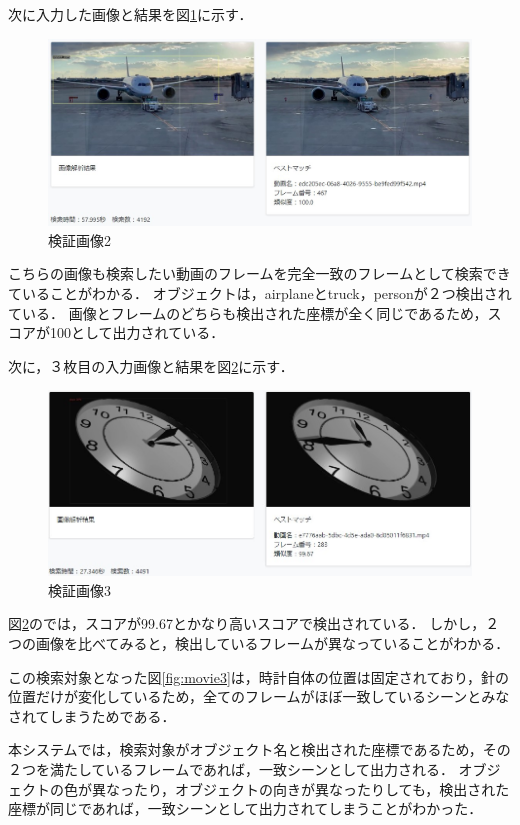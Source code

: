 \documentclass[a4j,12pt,dvipdfmx]{jreport}
\begin{document}
次に入力した画像と結果を図\ref{fig:img_1-2}に示す．
\begin{figure}[b]
  \centering
  \includegraphics[width=13cm]{image/result_1_2.jpg}
  \caption{検証画像2}
  \label{fig:img_1-2}
\end{figure}

こちらの画像も検索したい動画のフレームを完全一致のフレームとして検索できていることがわかる．
オブジェクトは，airplaneとtruck，personが２つ検出されている．
画像とフレームのどちらも検出された座標が全く同じであるため，スコアが100として出力されている．


次に，３枚目の入力画像と結果を図\ref{fig:img_1-3}に示す．
\begin{figure}[b]
  \centering
  \includegraphics[width=13cm]{image/result_1_3.jpg}
  \caption{検証画像3}
  \label{fig:img_1-3}
\end{figure}

図\ref{fig:img_1-3}のでは，スコアが99.67とかなり高いスコアで検出されている．
しかし，２つの画像を比べてみると，検出しているフレームが異なっていることがわかる．

この検索対象となった図\ref{fig:movie3}は，時計自体の位置は固定されており，針の位置だけが変化しているため，全てのフレームがほぼ一致しているシーンとみなされてしまうためである．

本システムでは，検索対象がオブジェクト名と検出された座標であるため，その２つを満たしているフレームであれば，一致シーンとして出力される．
オブジェクトの色が異なったり，オブジェクトの向きが異なったりしても，検出された座標が同じであれば，一致シーンとして出力されてしまうことがわかった．
\end{document}
